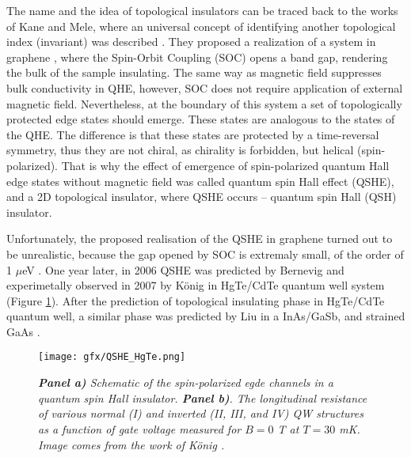 \documentclass[titlepage,a4paper]{book}
\begin{document}
The name and the idea of topological insulators can be traced back to the works of Kane and Mele, where an universal concept of identifying another topological index (invariant) was described \cite{Kane_Topology2}. They proposed a realization of a system in graphene \cite{Kane_Topology}, where the Spin-Orbit Coupling (SOC) opens a band gap, rendering the bulk of the sample insulating. The same way as magnetic field suppresses bulk conductivity in QHE, however, SOC does not require application of external magnetic field. Nevertheless, at the boundary of this system a set of topologically protected edge states should emerge. These states are analogous to the states of the QHE. The difference is that these states are protected by a time-reversal symmetry, thus they are not chiral, as chirality is forbidden, but helical (spin-polarized). That is why the effect of emergence of spin-polarized quantum Hall edge states without magnetic field was called quantum spin Hall effect (QSHE), and a 2D topological insulator, where QSHE occurs -- quantum spin Hall (QSH) insulator.

Unfortunately, the proposed realisation of the QSHE in graphene turned out to be unrealistic, because the gap opened by SOC is extremaly small, of the order of 1 $\mu$eV \cite{Yao_Topology}\cite{Min_Topology}. One year later, in 2006 QSHE was predicted by Bernevig \cite{Bernevig_Topology2}\cite{Bernevig_Topology1} and experimetally observed in 2007 by König \cite{Konig_Topology} in HgTe/CdTe quantum well system (Figure \ref{fig:QSHE_HgTe}). After the prediction of topological insulating phase in HgTe/CdTe quantum well,  a similar phase was predicted by Liu \cite{Liu_Topology} in a InAs/GaSb, and strained GaAs \cite{Bernevig_Topology1}. 

\begin{figure}[ht]
	\centering
	\texttt{[image: gfx/QSHE\_HgTe.png]}
	\vspace{-10pt}
	\caption{\textit{\textbf{Panel a)} Schematic of the spin-polarized egde channels in a quantum spin Hall insulator. \textbf{Panel b)}. The longitudinal resistance of various normal (I) and inverted (II, III, and IV) QW structures as a function of gate voltage measured for $B = 0$ T at $T = 30$ mK. Image comes from the work of König \cite{Konig_Topology}.}}
	\label{fig:QSHE_HgTe}
\end{figure} 
\end{document}

